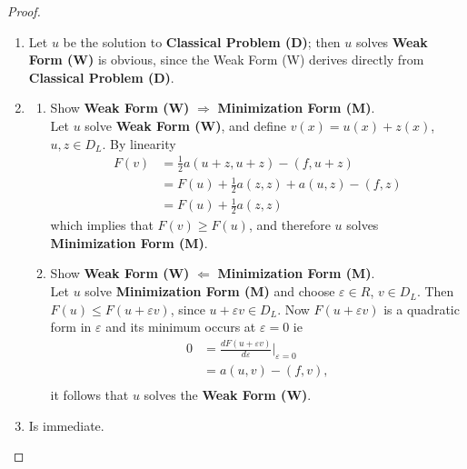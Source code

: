 \begin{proof}
\begin{enumerate}
\item
Let $u$ be the solution to \textbf{Classical Problem (D)}; then $u$ solves \textbf{Weak Form (W)} is obvious,
since the Weak Form (W) derives directly from \textbf{Classical Problem (D)}.
\item
\begin{enumerate}
\item Show \textbf{Weak Form (W)} $\Rightarrow$ \textbf{Minimization Form (M)}.\\
Let $u$ solve \textbf{Weak Form (W)}, and define $v(x)=u(x)+z(x)$, $u,z \in D_L$. By
linearity
\[\begin{array}{ll}
F(v)&=\frac{1}{2}a(u+z,u+z)-(f,u+z)\\
&=F(u)+\frac{1}{2}a(z,z)+a(u,z)-(f,z)\\
&=F(u)+\frac{1}{2}a(z,z)
\end{array}
 \]
which implies that $F(v) \geq F(u)$, and therefore $u$ solves \textbf{Minimization Form (M)}.
\item Show \textbf{Weak Form (W)} $\Leftarrow$ \textbf{Minimization Form (M)}.\\
Let $u$ solve \textbf{Minimization Form (M)} and choose $ \varepsilon \in R$, $v\in D_L$. 
Then $F(u)\leq F(u+\varepsilon v)$, since $u+\varepsilon v \in D_L$.
Now $F(u+\varepsilon v)$ is a quadratic form in $\varepsilon$ and its minimum occurs at $\varepsilon=0$ ie
\[\begin{array}{ll}
0&=\frac{dF(u+\varepsilon v)}{d \varepsilon}|_{\varepsilon=0}\\
&=a(u,v)-(f,v),\\
\end{array}
\]
it follows that $u$ solves the \textbf{Weak Form (W)}.
\end{enumerate}
\item
Is immediate.
\end{enumerate}
\end{proof}

